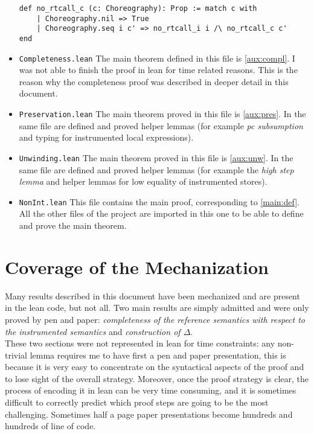 \documentclass[12pt,a4paper,twoside]{book}
\begin{document}
\begin{itemize}
\begin{samepage}
\begin{verbatim}
def no_rtcall_c (c: Choreography): Prop := match c with
    | Choreography.nil => True
    | Choreography.seq i c' => no_rtcall_i i /\ no_rtcall_c c'
end
\end{verbatim}
\end{samepage}
\item \texttt{Completeness.lean} The main theorem defined in this file is \ref{aux:compl}. I was not able to finish the proof in lean for time related reasons. This is the reason why the completeness proof was described in deeper detail in this document.
\item \texttt{Preservation.lean} The main theorem proved in this file is \ref{aux:pres}. In the same file are defined and proved helper lemmas (for example \emph{pc subsumption} and typing for instrumented local expressions).
\item \texttt{Unwinding.lean} The main theorem proved in this file is \ref{aux:unw}. In the same file are defined and proved helper lemmas (for example the \emph{high step lemma}\cite{myers2011proving} and helper lemmas for low equality of instrumented stores).
\item \texttt{NonInt.lean} This file contains the main proof, corresponding to \ref{main:def}.
All the other files of the project are imported in this one to be able to define and prove the main theorem.
\end{itemize}

\section{Coverage of the Mechanization}
Many results described in this document have been mechanized and are present in the lean code, but not all.
Two main results are simply admitted and were only proved by pen and paper: \emph{completeness of the reference semantics with respect to the instrumented semantics} and \emph{construction of $\Delta$}.\\
These two sections were not represented in lean for time constraints: any non-trivial lemma requires me to have first a pen and paper presentation, this is because it is very easy to concentrate on the syntactical aspects of the proof and to lose sight of the overall strategy.
Moreover, once the proof strategy is clear, the process of encoding it in lean can be very time consuming, and it is sometimes difficult to correctly predict which proof steps are going to be the most challenging. Sometimes half a page paper presentations become hundreds and hundreds of line of code.
\end{document}

